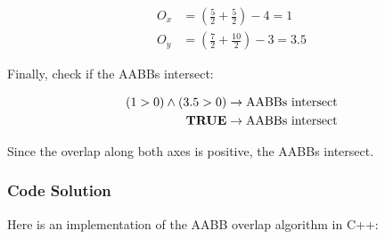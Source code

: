 \begin{equation*}
    \begin{aligned}
        O_x & = \left( \frac{5}{2} + \frac{5}{2} \right) - 4 = 1    \\
        O_y & = \left( \frac{7}{2} + \frac{10}{2} \right) - 3 = 3.5
    \end{aligned}
\end{equation*}

Finally, check if the AABBs intersect:

\begin{equation*}
    \begin{aligned}
        (1 > 0) \land (3.5 > 0)    & \rightarrow \text{AABBs intersect} \\
        \textnormal{\textbf{TRUE}} & \rightarrow \text{AABBs intersect}
    \end{aligned}
\end{equation*}

Since the overlap along both axes is positive, the AABBs intersect.

\subsubsection{Code Solution}

Here is an implementation of the AABB overlap algorithm in C++:

\begin{mdframed}[linecolor=black!30!white,linewidth=.5pt,extratopheight=1em]
    
\end{mdframed}

